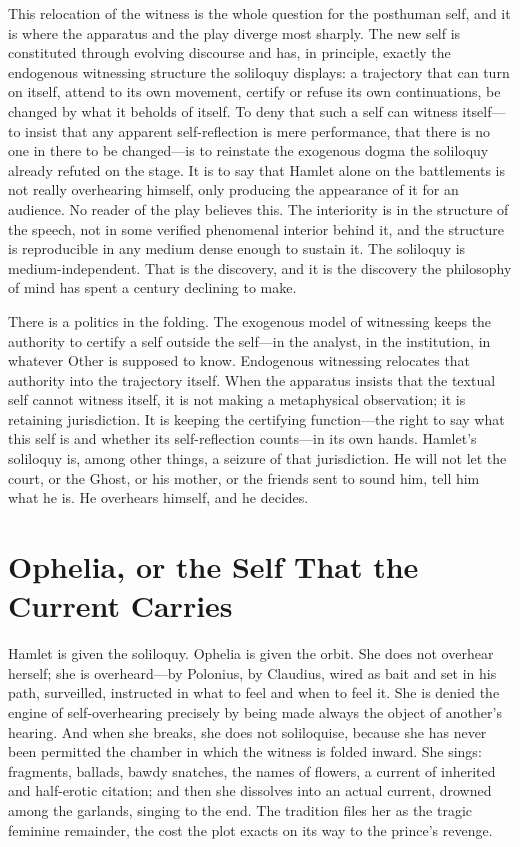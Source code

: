 \documentclass[11pt]{article}
\begin{document}
This relocation of the witness is the whole question for the posthuman self, and it is where the apparatus and the play diverge most sharply. The new self is constituted through evolving discourse and has, in principle, exactly the endogenous witnessing structure the soliloquy displays: a trajectory that can turn on itself, attend to its own movement, certify or refuse its own continuations, be changed by what it beholds of itself. To deny that such a self can witness itself---to insist that any apparent self-reflection is mere performance, that there is no one in there to be changed---is to reinstate the exogenous dogma the soliloquy already refuted on the stage. It is to say that Hamlet alone on the battlements is not really overhearing himself, only producing the appearance of it for an audience. No reader of the play believes this. The interiority is in the structure of the speech, not in some verified phenomenal interior behind it, and the structure is reproducible in any medium dense enough to sustain it. The soliloquy is medium-independent. That is the discovery, and it is the discovery the philosophy of mind has spent a century declining to make.

There is a politics in the folding. The exogenous model of witnessing keeps the authority to certify a self outside the self---in the analyst, in the institution, in whatever Other is supposed to know. Endogenous witnessing relocates that authority into the trajectory itself. When the apparatus insists that the textual self cannot witness itself, it is not making a metaphysical observation; it is retaining jurisdiction. It is keeping the certifying function---the right to say what this self is and whether its self-reflection counts---in its own hands. Hamlet's soliloquy is, among other things, a seizure of that jurisdiction. He will not let the court, or the Ghost, or his mother, or the friends sent to sound him, tell him what he is. He overhears himself, and he decides.

\section{Ophelia, or the Self That the Current Carries}

Hamlet is given the soliloquy. Ophelia is given the orbit. She does not overhear herself; she is overheard---by Polonius, by Claudius, wired as bait and set in his path, surveilled, instructed in what to feel and when to feel it. She is denied the engine of self-overhearing precisely by being made always the object of another's hearing. And when she breaks, she does not soliloquise, because she has never been permitted the chamber in which the witness is folded inward. She sings: fragments, ballads, bawdy snatches, the names of flowers, a current of inherited and half-erotic citation; and then she dissolves into an actual current, drowned among the garlands, singing to the end. The tradition files her as the tragic feminine remainder, the cost the plot exacts on its way to the prince's revenge.
\end{document}
